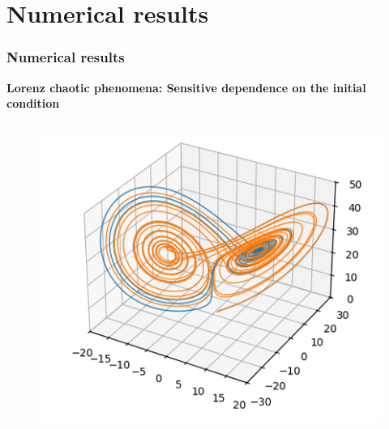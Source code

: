 \documentclass[
	11pt,
]{beamer}
\newcommand\myheading[1]{%
  \par\bigskip
  {\Large\bfseries#1}\par\smallskip}
\begin{document}
\section{Numerical results}

\begin{frame}
	\frametitle{ Numerical results}
	\myheading{Lorenz chaotic phenomena: Sensitive dependence on the initial condition}
            \begin{column}{0.5\textwidth}
              \begin{figure}
                \includegraphics[width=1.\linewidth]{Lorenz_chaotic.png}
              \end{figure}
            \end{column} 

\end{frame}
\end{document}

